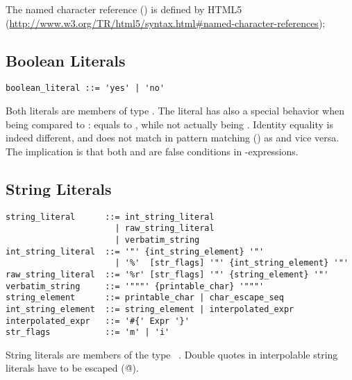 The named character reference () is defined by HTML5 (\url{http://www.w3.org/TR/html5/syntax.html#named-character-references});






\subsection{Boolean Literals}
\label{sec:booleanliterals}

\syntax\begin{lstlisting}
boolean_literal ::= 'yes' | 'no'
\end{lstlisting}

Both literals are members of type \lstinline@Boolean@. The \lstinline@no@ literal has also a special behavior when being compared to \lstinline@nil@: \lstinline@no@ equals to \lstinline@nil@, while not actually being \lstinline@nil@. Identity equality is indeed different, and  does not match in pattern matching () as  and vice versa. The implication is that both \lstinline@nil@ and \lstinline@no@ are false conditions in \lstinline@if@-expressions. 





\subsection{String Literals}
\label{sec:stringliterals}

\syntax\begin{lstlisting}
string_literal      ::= int_string_literal
                      | raw_string_literal
                      | verbatim_string
int_string_literal  ::= '"' {int_string_element} '"'
                      | '%'  [str_flags] '"' {int_string_element} '"'
raw_string_literal  ::= '%r' [str_flags] '"' {string_element} '"'
verbatim_string     ::= '"""' {printable_char} '"""'
string_element      ::= printable_char | char_escape_seq
int_string_element  ::= string_element | interpolated_expr
interpolated_expr   ::= '#{' Expr '}'
str_flags           ::= 'm' | 'i'
\end{lstlisting}

String literals are members of the type ~\lstinline@String@. Double quotes in interpolable string literals have to be escaped (\lstinline@\"@).

